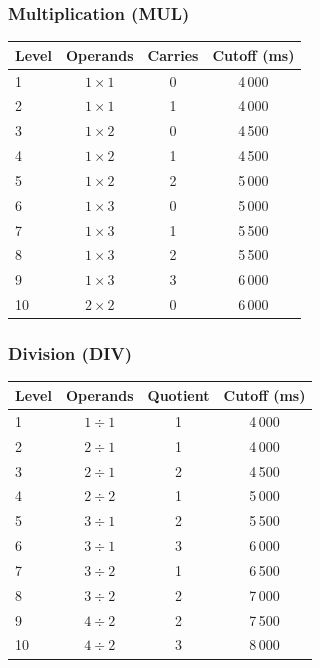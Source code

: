 \documentclass[11pt]{article}
\begin{document}
\vspace{2em}

\noindent
\begin{minipage}[t]{0.48\textwidth}
\subsubsection*{Multiplication (MUL)}
\begin{center}
\begin{tabular}{@{}lccc@{}}
\toprule
\textbf{Level} & \textbf{Operands} & \textbf{Carries} & \textbf{Cutoff (ms)} \\
\midrule
1  & $1 \times 1$ & 0 & 4\,000 \\
2  & $1 \times 1$ & 1 & 4\,000 \\
3  & $1 \times 2$ & 0 & 4\,500 \\
4  & $1 \times 2$ & 1 & 4\,500 \\
5  & $1 \times 2$ & 2 & 5\,000 \\
6  & $1 \times 3$ & 0 & 5\,000 \\
7  & $1 \times 3$ & 1 & 5\,500 \\
8  & $1 \times 3$ & 2 & 5\,500 \\
9  & $1 \times 3$ & 3 & 6\,000 \\
10 & $2 \times 2$ & 0 & 6\,000 \\
\bottomrule
\end{tabular}
\end{center}
\end{minipage}
\hfill
\begin{minipage}[t]{0.48\textwidth}
\subsubsection*{Division (DIV)}
\begin{center}
\begin{tabular}{@{}lccc@{}}
\toprule
\textbf{Level} & \textbf{Operands} & \textbf{Quotient} & \textbf{Cutoff (ms)} \\
\midrule
1  & $1 \div 1$ & 1 & 4\,000 \\
2  & $2 \div 1$ & 1 & 4\,000 \\
3  & $2 \div 1$ & 2 & 4\,500 \\
4  & $2 \div 2$ & 1 & 5\,000 \\
5  & $3 \div 1$ & 2 & 5\,500 \\
6  & $3 \div 1$ & 3 & 6\,000 \\
7  & $3 \div 2$ & 1 & 6\,500 \\
8  & $3 \div 2$ & 2 & 7\,000 \\
9  & $4 \div 2$ & 2 & 7\,500 \\
10 & $4 \div 2$ & 3 & 8\,000 \\
\bottomrule
\end{tabular}
\end{center}
\end{minipage}
\end{document}
